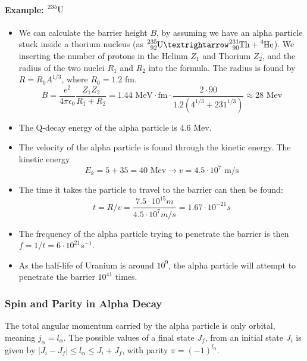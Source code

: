 \paragraph{Example: $\ce{_{}^{235}\text{U}_{}}$}
\begin{itemize}
  \item We can calculate the barrier height $B$, by assuming we have an alpha particle stuck inside a thorium nucleus (as $\ce{_{92}^{235}\text{U}_{}} → \ce{_{90}^{231}\text{Th}_{}} + \ce{_{}^{4}\text{He}_{}}$). We inserting the number of protons in the Helium $Z_1$ and Thorium $Z_2$, and the radius of the two nuclei $R_1$ and $R_2$ into the formula. The radius is found by $R = R_0A^{1/3}$, where $R_0 = 1.2$ fm.
  \begin{equation}
    B = \frac{e^2}{4πϵ_0} \frac{Z_1 Z_2}{R_1 + R_2} = 1.44 \text{ MeV} ⋅  \text{fm} ⋅ \frac{2 ⋅ 90}{1.2 \left(4^{1/3} + 231^{1/3}\right)} ≈ 28 \text{ Mev}
  \end{equation}
  
  \item The Q-decay energy of the alpha particle is $4.6$ Mev. 

  \item The velocity of the alpha particle is found through the kinetic energy. The kinetic energy 
  \begin{equation}
    E_k = 5 + 35  = 40\text{ Mev} → v = 4.5 ⋅ 10^{7} \text{ m/s}
  \end{equation}
  \item The time it takes the particle to travel to the barrier can then be found:
  \begin{equation}
    t = R/v = \frac{7.5 ⋅ 10^{15}m}{4.5 ⋅ 10^{7}m/s} = 1.67 ⋅ 10^{-21}s
  \end{equation} 
  \item The frequency of the alpha particle trying to penetrate the barrier is then $f = 1/t = 6 ⋅ 10^{21}s^{-1}$.
  \item As the half-life of Uranium is around $10^9$, the alpha particle will attempt to penetrate the barrier $10^{41}$ times.
\end{itemize}

\subsubsection{Spin and Parity in Alpha Decay}
The total angular momentum carried by the alpha particle is only orbital, meaning $j_{α} = l_{α}$. The possible values of a final state $J_f$, from an initial state $J_i$ is given by $\left|J_i - J_f\right| ≤ l_{α} ≤ J_i + J_f$, with parity $π = (-1)^{l_α}$.


